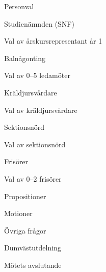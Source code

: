 \documentclass[prelim]{sektionsmote}
\begin{document}
\begin{ootd}

\item{Personval}
\begin{ootd}
    \item Studienämnden (SNF)
    \begin{ootd}
        \item Val av årskursrepresentant år 1
    \end{ootd}
    \item Balnågonting
    \begin{ootd}
        \item Val av 0--5 ledamöter
    \end{ootd}
    \item Kräldjursvårdare
    \begin{ootd}
        \item Val av kräldjursvårdare
    \end{ootd}
    \item Sektionsnörd
    \begin{ootd}
        \item Val av sektionsnörd
    \end{ootd}
    \item Frisörer
    \begin{ootd}
        \item Val av 0--2 frisörer
    \end{ootd}
\end{ootd}

\item{Propositioner}

\item{Motioner}

\item{Övriga frågor}

\item{Dumvästutdelning}

\item{Mötets avslutande}
\end{ootd}
\end{document}
